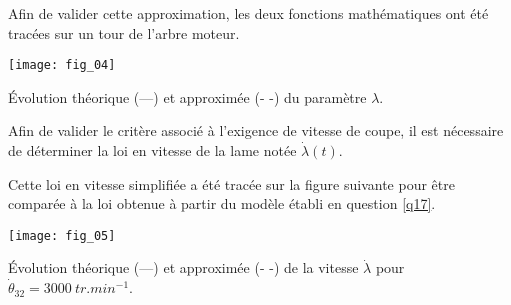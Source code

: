 \ifprof
\begin{corrige}
\end{corrige}
\else
\fi

\ifprof
\begin{corrige}
\end{corrige}
\else
\fi

\ifprof
\begin{corrige}
\end{corrige}
\else
\fi

Afin de valider cette approximation, les deux fonctions mathématiques ont été tracées sur un tour de
l’arbre moteur.
\begin{marginfigure}
\texttt{[image: fig\_04]}

\caption{Évolution théorique (---) et approximée (- -) du paramètre $\lambda$.}
\end{marginfigure}

\ifprof
\begin{corrige}
\end{corrige}
\else
\fi


Afin de valider le critère associé à l’exigence de vitesse de coupe, il est nécessaire de déterminer la
loi en vitesse de la lame notée $\dot{\lambda}(t)$.

\ifprof
\begin{corrige}
\end{corrige}
\else
\fi

Cette loi en vitesse simplifiée a été tracée sur la figure suivante pour être comparée à la loi obtenue à
partir du modèle établi en question \ref{q17}.

\begin{marginfigure}
\texttt{[image: fig\_05]}

\caption{Évolution théorique (---) et approximée (- -) de la vitesse  $\dot{\lambda}$ pour $\dot{\theta}_{32}=\SI{3000}{tr.min^{-1}}$.}
\end{marginfigure}


\ifprof
\begin{corrige}
\end{corrige}
\else
\fi

